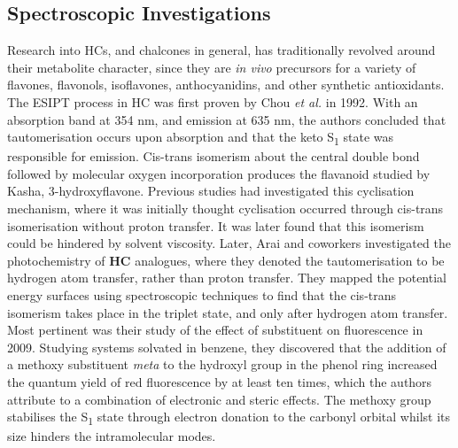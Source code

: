 \subsection{Spectroscopic Investigations}
Research into \acp{HC}, and chalcones in general, has traditionally revolved around their metabolite character, since they are \textit{in vivo} precursors for a variety of flavones, flavonols, isoflavones, anthocyanidins, and other synthetic antioxidants.\cite{Singh2014} The \ac{ESIPT} process in \ac{HC} was first proven by Chou \textit{et al.} in 1992.\cite{Chou1992} With an absorption band at 354 nm, and emission at 635 nm, the authors concluded that tautomerisation occurs upon absorption and that the keto S\textsubscript{1} state was responsible for emission. Cis-trans isomerism about the central double bond followed by molecular oxygen incorporation produces the flavanoid studied by Kasha, 3-hydroxyflavone. Previous studies had investigated this cyclisation mechanism, where it was initially thought cyclisation occurred through cis-trans isomerisation without proton transfer.\cite{Stermitz1975,Matsushima1985} It was later found that this isomerism could be hindered by solvent viscosity.\cite{Tokumura1998} Later, Arai and coworkers investigated the photochemistry of \textbf{HC} analogues, where they denoted the tautomerisation to be hydrogen atom transfer, rather than proton transfer.\cite{Arai1997,Norikane2002,Norikane2003,Kaneda2003,Kaneda2003a,Kaneda2004,Teshima2009} They mapped the potential energy surfaces using spectroscopic techniques to find that the cis-trans isomerism takes place in the triplet state, and only after hydrogen atom transfer. Most pertinent was their study of the effect of substituent on fluorescence in 2009.\cite{Teshima2009} Studying systems solvated in benzene, they discovered that the addition of a methoxy substituent \textit{meta} to the hydroxyl group in the phenol ring increased the quantum yield of red fluorescence by at least ten times, which the authors attribute to a combination of electronic and steric effects. The methoxy group stabilises the S\textsubscript{1} state through electron donation to the carbonyl \pipistar orbital whilst its size hinders the intramolecular modes. 
